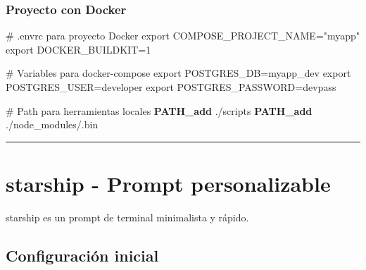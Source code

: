 \documentclass[
  11pt,
  letterpaper,
  oneside,
  openany]{scrbook}
\newenvironment{Shaded}{}{}
\newcommand{\BuiltInTok}[1]{\textcolor[rgb]{0.84,0.23,0.29}{#1}}
\newcommand{\CommentTok}[1]{\textcolor[rgb]{0.42,0.45,0.49}{#1}}
\newcommand{\ExtensionTok}[1]{\textcolor[rgb]{0.84,0.23,0.29}{\textbf{#1}}}
\newcommand{\NormalTok}[1]{\textcolor[rgb]{0.14,0.16,0.18}{#1}}
\newcommand{\OperatorTok}[1]{\textcolor[rgb]{0.14,0.16,0.18}{#1}}
\newcommand{\StringTok}[1]{\textcolor[rgb]{0.01,0.18,0.38}{#1}}
\newcommand{\VariableTok}[1]{\textcolor[rgb]{0.89,0.38,0.04}{#1}}
\begin{document}
\subsubsection{Proyecto con Docker}\label{proyecto-con-docker}

\begin{Shaded}
\begin{Highlighting}[]
\CommentTok{\# .envrc para proyecto Docker}
\BuiltInTok{export} \VariableTok{COMPOSE\_PROJECT\_NAME}\OperatorTok{=}\StringTok{"myapp"}
\BuiltInTok{export} \VariableTok{DOCKER\_BUILDKIT}\OperatorTok{=}\NormalTok{1}

\CommentTok{\# Variables para docker{-}compose}
\BuiltInTok{export} \VariableTok{POSTGRES\_DB}\OperatorTok{=}\NormalTok{myapp\_dev}
\BuiltInTok{export} \VariableTok{POSTGRES\_USER}\OperatorTok{=}\NormalTok{developer}
\BuiltInTok{export} \VariableTok{POSTGRES\_PASSWORD}\OperatorTok{=}\NormalTok{devpass}

\CommentTok{\# Path para herramientas locales}
\ExtensionTok{PATH\_add}\NormalTok{ ./scripts}
\ExtensionTok{PATH\_add}\NormalTok{ ./node\_modules/.bin}
\end{Highlighting}
\end{Shaded}

\begin{center}\rule{0.5\linewidth}{0.5pt}\end{center}

\section{starship - Prompt personalizable}\label{sec-starship}

starship es un prompt de terminal minimalista y rápido.

\subsection{Configuración inicial}\label{configuraciuxf3n-inicial-5}

\begin{Shaded}
\end{Shaded}
\end{document}
